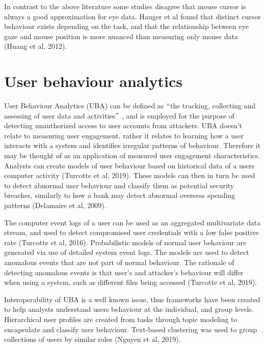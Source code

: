 \documentclass[12pt]{article}
\renewcommand{\_}{\kern-1.5pt\textunderscore\kern-1.5pt}
\begin{document}
\vspace{\baselineskip}
In contrast to the above literature some studies disagree that mouse cursor is always a good approximation for eye data. Hauger et al found that distinct cursor behaviour exists depending on the task, and that the relationship between eye gaze and mouse position is more nuanced than measuring only mouse data (Huang et al, 2012). \par

\section*{User behaviour analytics}
User Behaviour Analytics (UBA) can be defined as $``$the tracking, collecting and assessing of user data and activities$"$ , and is employed for the purpose of detecting unauthorized access to user accounts from attackers. UBA doesn't relate to measuring user engagement, rather it relates to learning how a user interacts with a system and identifies irregular patterns of behaviour. Therefore it may be thought of as an application of measured user engagement characteristics. Analysts can create models of user behaviour based on historical data of a users computer activity (Turcotte et al, 2019). These models can then in turn be used to detect abnormal user behaviour and classify them as potential security breaches, similarly to how a bank may detect abnormal overseas spending patterns (Delamaire et al, 2009).\par


\vspace{\baselineskip}
The computer event logs of a user can be used as an aggregated multivariate data stream, and used to detect compromised user credentials with a low false positive rate (Turcotte et al, 2016). Probabilistic models of normal user behaviour are generated via use of detailed system event logs. The models are used to detect anomalous events that are not part of normal behaviour. The rationale of detecting anomalous events is that user’s and attacker’s behaviour will differ when using a system, such as different files being accessed (Turcotte et al, 2019).\par


\vspace{\baselineskip}
Interoperability of UBA is a well known issue, thus frameworks have been created to help analysts understand users behaviour at the individual, and group levels. Hierarchical user profiles are created from tasks through topic modeling to encapsulate and classify user behaviour. Text-based clustering was used to group collections of users by similar roles (Nguyen et al, 2019).\par
\end{document}
